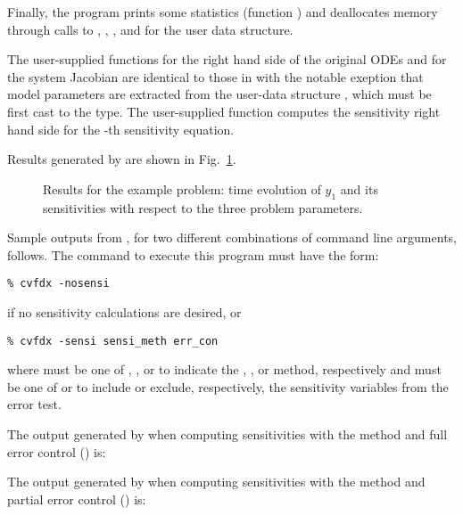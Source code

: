 Finally, the program prints some statistics (function ) 
and deallocates memory through calls
to , , 
, and  for the user data structure.

The user-supplied functions  for the right hand side of the original ODEs and
 for the system Jacobian are identical to those in  with the 
notable exeption that model parameters are extracted from the user-data structure
, which must be first cast to the  type. The user-supplied
function  computes the sensitivity right hand side for the -th 
sensitivity equation.

Results generated by  are shown in Fig.~\ref{f:cvfdx}. 
\begin{figure}
  {\centerline{}}
  \caption{Results for the  example problem:
    time evolution of $y_1$ and its sensitivities with respect to the
    three problem parameters.}
  \label{f:cvfdx}
\end{figure}
Sample outputs from , for two different combinations of command line arguments, 
follows. The command to execute this program must have the form:
\begin{verbatim}
% cvfdx -nosensi
\end{verbatim} 
if no sensitivity calculations are desired, or
\begin{verbatim}
% cvfdx -sensi sensi_meth err_con
\end{verbatim}
where  must be one of , , or  to
indicate the , , or  method,
respectively and  must be one of  or  to
include or exclude, respectively, the sensitivity variables from the error test.

The output generated by  when computing sensitivities with the 
method and full error control () is:


The output generated by  when computing sensitivities with the 
method and partial error control () is:


